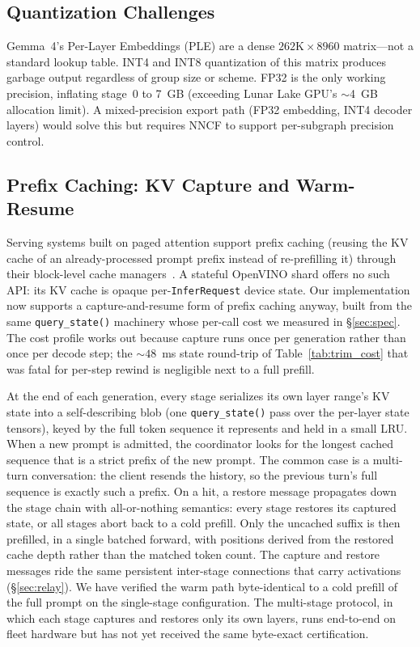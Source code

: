 \documentclass[11pt]{article}
\begin{document}
\subsection{Quantization Challenges}

Gemma~4's Per-Layer Embeddings (PLE) are a dense $262\text{K} \times 8960$ matrix---not a standard lookup table. INT4 and INT8 quantization of this matrix produces garbage output regardless of group size or scheme. FP32 is the only working precision, inflating stage~0 to 7~GB (exceeding Lunar Lake GPU's $\sim$4~GB allocation limit). A mixed-precision export path (FP32 embedding, INT4 decoder layers) would solve this but requires NNCF to support per-subgraph precision control.

\subsection{Prefix Caching: KV Capture and Warm-Resume}
\label{sec:prefix_cache}

Serving systems built on paged attention support prefix caching (reusing the KV cache of an already-processed prompt prefix instead of re-prefilling it) through their block-level cache managers~\cite{kwon2023vllm}. A stateful OpenVINO shard offers no such API: its KV cache is opaque per-\texttt{InferRequest} device state. Our implementation now supports a capture-and-resume form of prefix caching anyway, built from the same \texttt{query\_state()} machinery whose per-call cost we measured in \S\ref{sec:spec}. The cost profile works out because capture runs once per generation rather than once per decode step; the ${\sim}48$~ms state round-trip of Table~\ref{tab:trim_cost} that was fatal for per-step rewind is negligible next to a full prefill.

At the end of each generation, every stage serializes its own layer range's KV state into a self-describing blob (one \texttt{query\_state()} pass over the per-layer state tensors), keyed by the full token sequence it represents and held in a small LRU. When a new prompt is admitted, the coordinator looks for the longest cached sequence that is a strict prefix of the new prompt. The common case is a multi-turn conversation: the client resends the history, so the previous turn's full sequence is exactly such a prefix. On a hit, a restore message propagates down the stage chain with all-or-nothing semantics: every stage restores its captured state, or all stages abort back to a cold prefill. Only the uncached suffix is then prefilled, in a single batched forward, with positions derived from the restored cache depth rather than the matched token count. The capture and restore messages ride the same persistent inter-stage connections that carry activations (\S\ref{sec:relay}). We have verified the warm path byte-identical to a cold prefill of the full prompt on the single-stage configuration. The multi-stage protocol, in which each stage captures and restores only its own layers, runs end-to-end on fleet hardware but has not yet received the same byte-exact certification.
\end{document}
